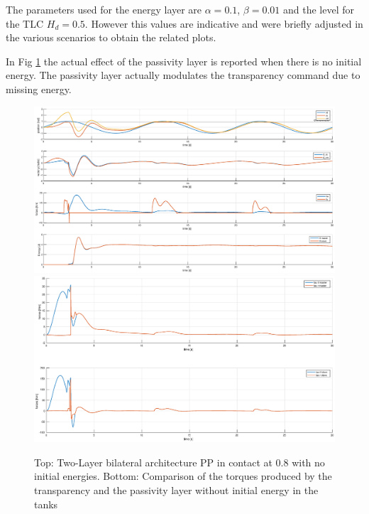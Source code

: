 \documentclass[a4paper,12pt]{article}
\begin{document}
The parameters used for the energy layer are $\alpha = 0.1$, $\beta = 0.01$ and the level for the TLC $H_d = 0.5$. However this values are indicative and were briefly adjusted in the various scenarios to obtain the related plots.
\bigskip

In Fig \ref{fig:energy_pp_no_energy} the actual effect of the passivity layer is reported when there is no initial energy. The passivity layer actually modulates the transparency command due to missing energy.

\begin{figure}[H]
    \hspace*{-4.5cm}
    \includegraphics[scale=0.5]{images/energy_pp_no_energy.eps}
    \qquad
    \hspace*{-1.5cm}
    \includegraphics[scale=0.4]{images/energy_pp_tau.eps}
    \caption{Top: Two-Layer bilateral architecture PP in contact at 0.8 with no initial energies. Bottom: Comparison of the torques produced by the transparency and the passivity layer without initial energy in the tanks}
    \label{fig:energy_pp_no_energy}
\end{figure}
\end{document}
